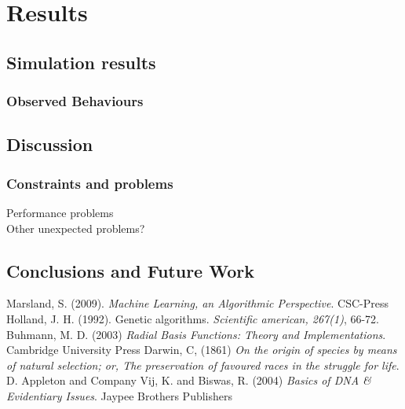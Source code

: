 \documentclass[a4paper,11pt]{kth-mag}
\begin{document}
\chapter{Results}
\section{Simulation results}
\subsection{Observed Behaviours}
\section{Discussion}
\subsection{Constraints and problems}
Performance problems\\
Other unexpected problems?\\

\section{Conclusions and Future Work}

\begin{thebibliography}{9}

Marsland, S. (2009). \emph{Machine Learning, an Algorithmic Perspective}. CSC-Press
Holland, J. H. (1992). Genetic algorithms. \emph{Scientific american, 267(1)}, 66-72.
Buhmann, M. D. (2003) \emph{Radial Basis Functions: Theory and Implementations}. Cambridge University Press
Darwin, C, (1861) \emph{On the origin of species by means of natural selection; or, The preservation of favoured races in the struggle for life}. D. Appleton and Company
Vij, K. and Biswas, R. (2004) \emph{Basics of DNA \& Evidentiary Issues}. Jaypee Brothers Publishers

\end{thebibliography}
\end{document}
